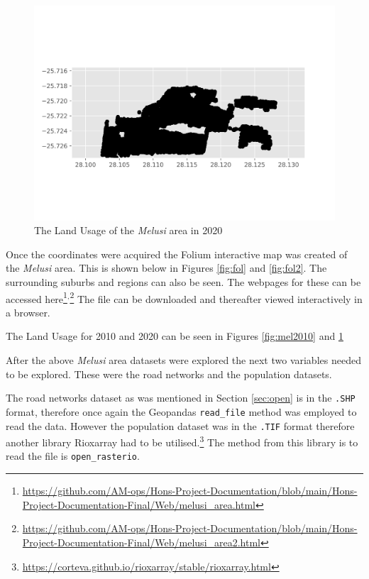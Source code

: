 \begin{figure}[H]
\centering
\includegraphics[width=1\textwidth]{Figures/Chapter3/Melusi2020}
\caption{The Land Usage of the \textit{Melusi} area in 2020}
\label{fig:mel2020}
\end{figure}
Once the coordinates were acquired the Folium interactive map was created of the \textit{Melusi} area. This is shown below in Figures \ref{fig:fol} and \ref{fig:fol2}. The surrounding suburbs and regions can also be seen. The webpages for these can be accessed here\footnote{\url{https://github.com/AM-ops/Hons-Project-Documentation/blob/main/Hons-Project-Documentation-Final/Web/melusi_area.html}}$^{,}$\footnote{\url{https://github.com/AM-ops/Hons-Project-Documentation/blob/main/Hons-Project-Documentation-Final/Web/melusi_area2.html}}
The file can be downloaded and thereafter viewed interactively in a browser.

The Land Usage for 2010 and 2020 can be seen in Figures \ref{fig:mel2010} and \ref{fig:mel2020}

After the above \textit{Melusi} area datasets were explored the next two variables needed to be explored. These were the road networks and the population datasets.

The road networks dataset as was mentioned in Section \ref{sec:open} is in the \texttt{.SHP} format, therefore once again the Geopandas \texttt{read\_file} method was employed to read the data. However the population dataset was in the \texttt{.TIF} format therefore another library Rioxarray had to be utilised.\footnote{\url{https://corteva.github.io/rioxarray/stable/rioxarray.html}} The method from this library is to read the file is \texttt{open\_rasterio}.

